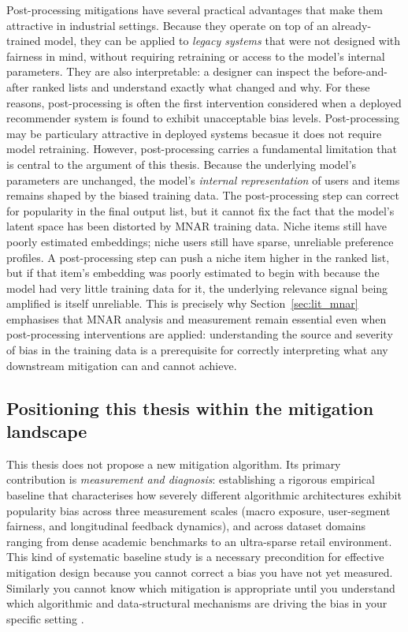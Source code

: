 \documentclass[11pt,a4paper]{report}
\begin{document}
Post-processing mitigations have several practical advantages that make them attractive in industrial settings. Because they operate on top of an already-trained model, they can be applied to \emph{legacy systems} that were not designed with fairness in mind, without requiring retraining or access to the model's internal parameters. They are also interpretable: a designer can inspect the before-and-after ranked lists and understand exactly what changed and why. For these reasons, post-processing is often the first intervention considered when a deployed recommender system is found to exhibit unacceptable bias levels.
Post-processing may be particulary attractive in deployed systems becasue it does not require model retraining.
However, post-processing carries a fundamental limitation that is central to the argument of this thesis. Because the underlying model's parameters are unchanged, the model's \emph{internal representation} of users and items remains shaped by the biased training data. The post-processing step can correct for popularity in the final output list, but it cannot fix the fact that the model's latent space has been distorted by MNAR training data. Niche items still have poorly estimated embeddings; niche users still have sparse, unreliable preference profiles. A post-processing step can push a niche item higher in the ranked list, but if that item's embedding was poorly estimated to begin with because the model had very little training data for it, the underlying relevance signal being amplified is itself unreliable. This is precisely why Section~\ref{sec:lit_mnar} emphasises that MNAR analysis and measurement remain essential even when post-processing interventions are applied: understanding the source and severity of bias in the training data is a prerequisite for correctly interpreting what any downstream mitigation can and cannot achieve.

\subsection*{Positioning this thesis within the mitigation landscape}

This thesis does not propose a new mitigation algorithm. Its primary contribution is \emph{measurement and diagnosis}: establishing a rigorous empirical baseline that characterises how severely different algorithmic architectures exhibit popularity bias across three measurement scales (macro exposure, user-segment fairness, and longitudinal feedback dynamics), and across dataset domains ranging from dense academic benchmarks to an ultra-sparse retail environment. This kind of systematic baseline study is a necessary precondition for effective mitigation design because you cannot correct a bias you have not yet measured. Similarly you cannot know which mitigation is appropriate until you understand which algorithmic and data-structural mechanisms are driving the bias in your specific setting \citep{klimashevskaia2024survey}.
\end{document}
